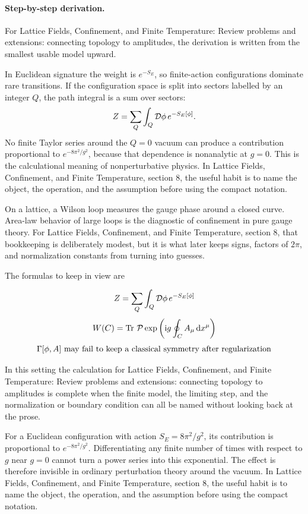 \paragraph{Step-by-step derivation.}

For Lattice Fields, Confinement, and Finite Temperature: Review problems and extensions: connecting topology to amplitudes, the derivation is written from the smallest usable model upward.

In Euclidean signature the weight is \(e^{-S_E}\), so finite-action configurations dominate rare transitions.  If the configuration space is split into sectors labelled by an integer \(Q\), the path integral is a sum over sectors:
\[
  Z=\sum_Q\int_Q\mathcal D\phi\,e^{-S_E[\phi]}.
\]
No finite Taylor series around the \(Q=0\) vacuum can produce a contribution proportional to \(e^{-8\pi^2/g^2}\), because that dependence is nonanalytic at \(g=0\).  This is the calculational meaning of nonperturbative physics.  In Lattice Fields, Confinement, and Finite Temperature, section 8, the useful habit is to name the object, the operation, and the assumption before using the compact notation.

On a lattice, a Wilson loop measures the gauge phase around a closed curve.  Area-law behavior of large loops is the diagnostic of confinement in pure gauge theory.  For Lattice Fields, Confinement, and Finite Temperature, section 8, that bookkeeping is deliberately modest, but it is what later keeps signs, factors of \(2\pi\), and normalization constants from turning into guesses.

The formulas to keep in view are

\[
  Z=\sum_Q\int_Q\mathcal D\phi\,e^{-S_E[\phi]}
\]
\[
  W(C)=\operatorname{Tr}\,\mathcal P\exp\left(\mathrm i g\oint_C A_\mu\,\mathrm d x^\mu\right)
\]
\[
  \Gamma[\phi,A]\hbox{ may fail to keep a classical symmetry after regularization}
\]

In this setting the calculation for Lattice Fields, Confinement, and Finite Temperature: Review problems and extensions: connecting topology to amplitudes is complete when the finite model, the limiting step, and the normalization or boundary condition can all be named without looking back at the prose.




\begin{example}
For a Euclidean configuration with action \(S_E=8\pi^2/g^2\), its contribution is proportional to \(e^{-8\pi^2/g^2}\).  Differentiating any finite number of times with respect to \(g\) near \(g=0\) cannot turn a power series into this exponential.  The effect is therefore invisible in ordinary perturbation theory around the vacuum.  In Lattice Fields, Confinement, and Finite Temperature, section 8, the useful habit is to name the object, the operation, and the assumption before using the compact notation.
\end{example}



